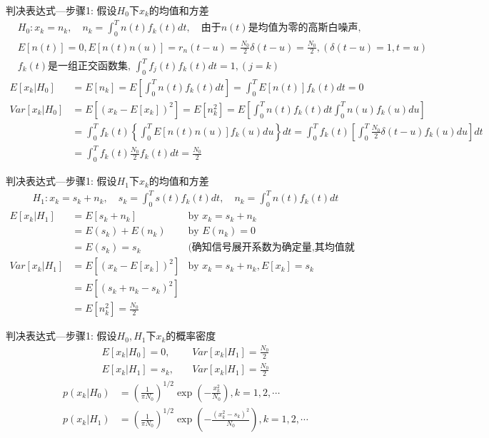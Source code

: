 \begin{frame}[shrink]{判决表达式---步骤1: 假设$H_0$下$x_k$的均值和方差}
\begin{align*}
&H_0: x_k=n_k, \quad n_k=\int_{0}^{T}n(t)f_k(t)dt, \quad\text{由于$n(t)$是均值为零的高斯白噪声, }\\
&E[n(t)]=0, E[n(t)n(u)]=r_n(t-u) =\frac{N_0}{2}\delta(t-u)=\frac{N_0}{2},(\delta(t-u)=1,t=u)\\
&\text{$f_k(t)$是一组正交函数集, } \int_{0}^{T}f_j(t)f_k(t)dt=1,(j=k)
\end{align*}
\begin{align*}
E[x_k|H_0]&=E[n_k]=E\left[\int_{0}^{T}n(t)f_k(t)dt\right]=\int_{0}^{T}E[n(t)]f_k(t)dt=0\\
Var[x_k|H_0]&=E[(x_k-E[x_k])^2]=E[n_k^2]=E\left[\int_{0}^{T}n(t)f_k(t)dt\int_{0}^{T}n(u)f_k(u)du\right]\\
&=\int_{0}^{T}f_k(t)\left\{\int_{0}^{T}E[n(t)n(u)]f_k(u)du\right\}dt=\int_{0}^{T}f_k(t)\left[\int_{0}^{T}\frac{N_0}{2}\delta(t-u)f_k(u)du\right]dt\\
&=\int_{0}^{T}f_k(t)\frac{N_0}{2}f_k(t)dt=\frac{N_0}{2}
\end{align*}
\end{frame}

\begin{frame}[shrink]{判决表达式---步骤1: 假设$H_1$下$x_k$的均值和方差}
\begin{align*}
H_1: x_k=s_k+n_k, \quad s_k=\int_{0}^{T}s(t)f_k(t)dt, \quad n_k=\int_{0}^{T}n(t)f_k(t)dt
\end{align*}
\begin{align*}
E[x_k|H_1]&=E[s_k+n_k]&\text{by }x_k=s_k+n_k \\
&=E(s_k)+E(n_k)&\text{by }E(n_k)=0 \\
&=E(s_k)=s_k&\text{(确知信号展开系数为确定量,其均值就是本身)}\\
Var[x_k|H_1]&=E[(x_k-E[x_k])^2]&\text{by }x_k=s_k+n_k,E[x_k]=s_k\\
&=E[(s_k+n_k-s_k)^2]&\\
&=E[n_k^2]=\frac{N_0}{2}&
\end{align*}
\end{frame}

\begin{frame}[shrink]{判决表达式---步骤1: 假设$H_0,H_1$下$x_k$的概率密度}
\begin{align*}
E[x_k|H_0]=0,   &\quad Var[x_k|H_1]=\frac{N_0}{2}\\
E[x_k|H_1]=s_k, &\quad Var[x_k|H_1]=\frac{N_0}{2}
\end{align*}
\begin{align*}
p(x_k|H_0)&=\left(\frac{1}{\pi N_0}\right)^{1/2}\exp\left(-\frac{x_k^2}{N_0}\right), k=1,2,\cdots\\
p(x_k|H_1)&=\left(\frac{1}{\pi N_0}\right)^{1/2}\exp\left(-\frac{(x_k^2-s_k)^2}{N_0}\right), k=1,2,\cdots
\end{align*}
\end{frame}

